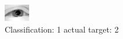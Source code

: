 \begin{figure}[h!]
\begin{center}
\includegraphics[width=0.60\columnwidth]{figures/ID2232_class_1_target_2.png}
\end{center}
\caption{ Classification: 1 actual target: 2}
\label{fig:ID2232_class_1_target_2}
\end{figure}
